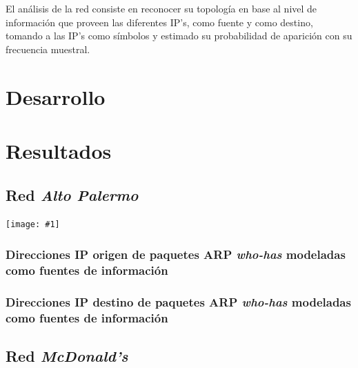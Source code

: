 \documentclass[a4paper, 10pt, twoside]{article}
\newcommand{\grafo}[1]{
  \texttt{[image: \#1]}
}
\begin{document}
El análisis de la red consiste en reconocer su topología en base al nivel de información que proveen las diferentes IP's, como fuente y como destino, tomando a las IP's como símbolos y estimado su probabilidad de aparición con su frecuencia muestral.




\section{Desarrollo}





\section{Resultados}


\subsection{Red \emph{Alto Palermo}}

\grafo{altopalermo}


\subsubsection{Direcciones IP origen de paquetes ARP \emph{who-has} modeladas como fuentes de información}




\subsubsection{Direcciones IP destino de paquetes ARP \emph{who-has} modeladas como fuentes de información}



\subsection{Red \emph{McDonald's}}
\end{document}
